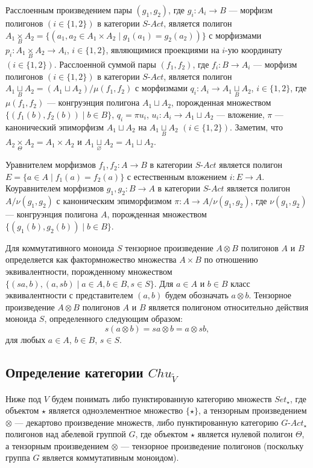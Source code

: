\documentclass[a4paper,12pt]{article}
\newcommand{\SAct}{S\text{-}Act}
\newcommand{\GAct}{G\text{-}Act}
\begin{document}
Расслоенным произведением пары $(g_1,g_2)$, где $g_i: A_i \to B$ --- морфизм полигонов $(i \in \{1,2\})$ в категории $\SAct$, является полигон $A_1 \underset{B}{\times} A_2 = \{(a_1,a_2 \in A_1 \times A_2 \mid g_1(a_1) = g_2(a_2))\}$ с морфизмами $p_i: A_1 \underset{B}{\times} A_2 \to A_i$, $i \in \{1,2\}$, являющимися проекциями на $i$-ую координату $(i \in \{1,2\})$. Расслоенной суммой пары $(f_1,f_2)$, где $f_i: B \to A_i$ --- морфизм полигонов $(i \in \{1,2\})$ в категории $\SAct$, является полигон $A_1 \underset{B}{\sqcup} A_2 = (A_1 \sqcup A_2)/\mu(f_1,f_2)$ с морфизмами $q_i: A_i \to A_1 \underset{B}{\sqcup} A_2$, $i \in \{1,2\}$, где $\mu(f_1,f_2)$ --- конгруэнция полигона $A_1 \sqcup A_2$, порожденная множеством $\{(f_1(b),f_2(b)) \mid b \in B\}$, $q_i = \pi u_i$, $u_i: A_i \to A_1 \sqcup A_2$ --- вложение, $\pi$ --- канонический эпиморфизм $A_1 \sqcup A_2$ на $A_1 \underset{B}{\sqcup} A_2$ $(i \in \{1,2\})$. Заметим, что $A_2 \underset{\Theta}{\times} A_2 = A_1 \times A_2$ и $A_1 \underset{\varnothing}{\sqcup} A_2 = A_1 \sqcup A_2$.

Уравнителем морфизмов $f_1,f_2: A \to B$ в категории $\SAct$ является полигон $E = \{a \in A \mid f_1(a) = f_2(a)\}$ с естественным вложением $i: E \to A$. Коуравнителем морфизмов $g_1,g_2: B \to A$ в категории $\SAct$ является полигон $A/\nu(g_1,g_2)$ с каноническим эпиморфизмом $\pi: A \to A/\nu(g_1,g_2)$, где $\nu(g_1,g_2)$ --- конгруэнция полигона $A$, порожденная множеством $\{(g_1(b), g_2(b)) \mid b \in B\}$.

Для коммутативного моноида $S$ тензорное произведение $A \otimes B$ полигонов $A$ и $B$ определяется как фактормножество множества $A \times B$ по отношению эквивалентности, порожденному множеством $\{(sa,b), (a,sb) \mid a \in A, b \in B, s \in S\}$. Для $a \in A$ и $b \in B$ класс эквивалентности с представителем $(a,b)$ будем обозначать $a \otimes b$. Тензорное произведение $A \otimes B$ полигонов $A$ и $B$ является полигоном относительно действия моноида $S$, определенного следующим образом:
$$
    s(a \otimes b) = sa \otimes b = a \otimes sb,
$$
для любых $a \in A$, $b \in B$, $s \in S$.

\subsection*{Определение категории $Chu_{\widetilde{V}}$}

Ниже под $V$ будем понимать либо пунктированную категорию множеств $Set_\star$, где объектом $\star$ является одноэлементное множество $\{\star\}$, а тензорным произведением $\otimes$ --- декартово произведение множеств, либо пунктированную категорию $\GAct_{\star}$ полигонов над абелевой группой $G$, где объектом $\star$ является нулевой полигон $\Theta$, а тензорным произведением $\otimes$ --- тензорное произведение полигонов (поскольку группа $G$ является коммутативным моноидом).
\end{document}
